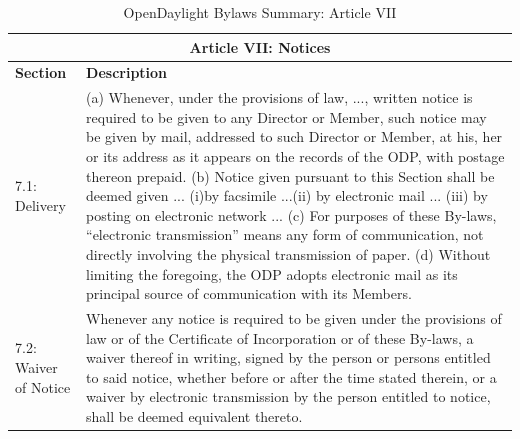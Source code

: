 \documentclass[a4paper, 12pt]{book}
\begin{document}
\begin{table}[H]
  \begin{center}
    \begin{tabular}{ | p{4cm} | p{11cm} | }
    \toprule
    \multicolumn {2}{|c|}{\textbf{Article VII: Notices}} \\
    \hline
    \textbf{Section} & \textbf{Description} \\
    \hline
    7.1: Delivery & (a) Whenever, under the provisions of law, ..., written notice is required to be given to any Director or Member, such notice may be given by mail, addressed to such Director or Member, at his, her or its address as it appears on the records of the ODP, with postage thereon prepaid. (b) Notice given pursuant to this Section shall be deemed given ... (i)by facsimile ...(ii) by electronic mail ... (iii) by posting on electronic network ... (c) For purposes of these By-laws, “electronic transmission” means any form of communication, not directly involving the physical transmission of paper. (d) Without limiting the foregoing, the ODP adopts electronic mail as its principal source of communication with its Members.\\
    \hline
    7.2: Waiver of Notice & Whenever any notice is required to be given under the provisions of law or of the Certificate of Incorporation or of these By-laws, a waiver thereof in writing, signed by the person or persons entitled to said notice, whether before or after the time stated therein, or a waiver by electronic transmission by the person entitled to notice, shall be deemed equivalent thereto.\\
    \bottomrule
    \end{tabular}
    \caption{OpenDaylight Bylaws Summary: Article VII}
    \label{tab:odlbylaws-art07}
  \end{center}
\end{table}
\end{document}
